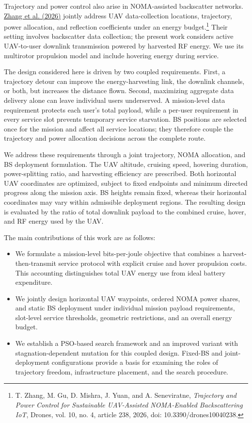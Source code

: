 \documentclass[conference]{IEEEtran}
\begin{document}
Trajectory and power control also arise in NOMA-assisted backscatter networks. \href{https://doi.org/10.3390/drones10040238}{Zhang et al. (2026)} jointly address UAV data-collection locations, trajectory, power allocation, and reflection coefficients under an energy budget.\footnote{T. Zhang, M. Gu, D. Mishra, J. Yuan, and A. Seneviratne, \emph{Trajectory and Power Control for Sustainable UAV-Assisted NOMA-Enabled Backscattering IoT}, Drones, vol. 10, no. 4, article 238, 2026, doi: 10.3390/drones10040238.} Their setting involves backscatter data collection; the present work considers active UAV-to-user downlink transmission powered by harvested RF energy. We use its multirotor propulsion model and include hovering energy during service.

The design considered here is driven by two coupled requirements. First, a trajectory detour can improve the energy-harvesting link, the downlink channels, or both, but increases the distance flown. Second, maximizing aggregate data delivery alone can leave individual users underserved. A mission-level data requirement protects each user's total payload, while a per-user requirement in every service slot prevents temporary service starvation. BS positions are selected once for the mission and affect all service locations; they therefore couple the trajectory and power allocation decisions across the complete route.

We address these requirements through a joint trajectory, NOMA allocation, and BS deployment formulation. The UAV altitude, cruising speed, hovering duration, power-splitting ratio, and harvesting efficiency are prescribed. Both horizontal UAV coordinates are optimized, subject to fixed endpoints and minimum directed progress along the mission axis. BS heights remain fixed, whereas their horizontal coordinates may vary within admissible deployment regions. The resulting design is evaluated by the ratio of total downlink payload to the combined cruise, hover, and RF energy used by the UAV.

The main contributions of this work are as follows:
\begin{itemize}
\item We formulate a mission-level bits-per-joule objective that combines a harvest-then-transmit service protocol with explicit cruise and hover propulsion costs. This accounting distinguishes total UAV energy use from ideal battery expenditure.
\item We jointly design horizontal UAV waypoints, ordered NOMA power shares, and static BS deployment under individual mission payload requirements, slot-level service thresholds, geometric restrictions, and an overall energy budget.
\item We establish a PSO-based search framework and an improved variant with stagnation-dependent mutation for this coupled design. Fixed-BS and joint-deployment configurations provide a basis for examining the roles of trajectory freedom, infrastructure placement, and the search procedure.
\end{itemize}
\end{document}
